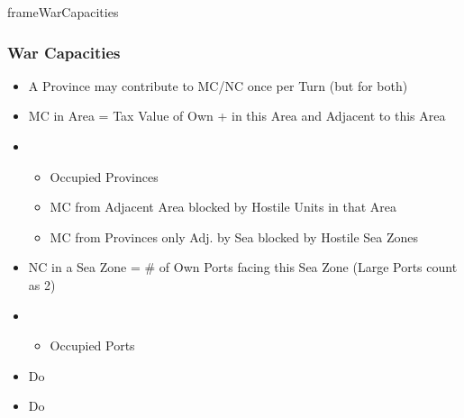 \documentclass[10pt]{article}
\newlength{\fhWarCapacities} \setlength\fhWarCapacities{17\baselineskip}
\begin{document}
\begin{dynamiccontents*}{frameWarCapacities}\begin{eubox}{\fhWarCapacities}
	\subsubsection*{War Capacities }
	\begin{itemize}
		\item A Province may contribute to MC/NC once per Turn (but for both)
	\end{itemize}	
	\begin{itemize}
		\item MC in Area = Tax Value of Own \towns + \vassals in this Area and Adjacent to this Area
		\item {}
		\begin{itemize}
			\item Occupied Provinces
			\item MC from Adjacent Area blocked by Hostile Units in that Area
			\item MC from Provinces only Adj. by Sea blocked by Hostile Sea Zones
		\end{itemize}
	\end{itemize}
	\begin{itemize}
		\item NC in a Sea Zone = \# of Own Ports facing this Sea Zone (Large Ports count as 2)
		\item {}
		\begin{itemize}
			\item Occupied Ports
		\end{itemize}
	\end{itemize}
\end{eubox}\end{dynamiccontents*}

\begin{itemize}
	\item Do   
\end{itemize}

\begin{itemize}
	\item Do   
\end{itemize}
\end{document}
